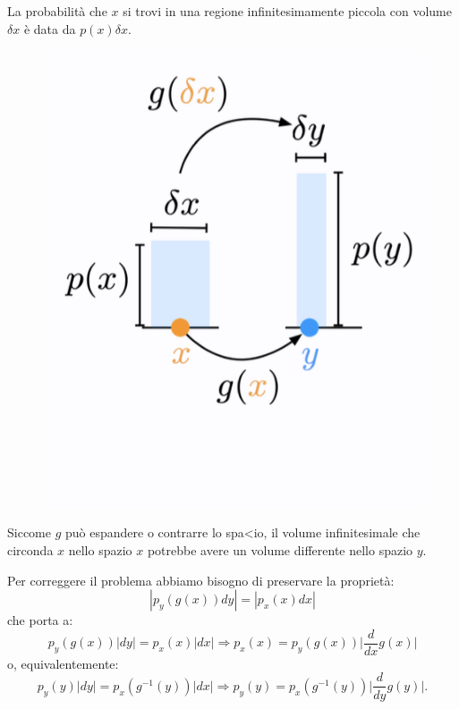 La probabilità che $x$ si trovi in una regione infinitesimamente piccola con volume $\delta x$ è data da $p(x)\delta x$.
\begin{figure}[!h]
    \includegraphics[scale=.7]{images/prerequisites/ex02.png}
    \centering
\end{figure}



Siccome $g$ può espandere o contrarre lo spa<io, il volume infinitesimale che circonda $x$ nello spazio $x$ potrebbe avere un volume differente nello spazio $y$.



Per correggere il problema abbiamo bisogno di preservare la proprietà:
\begin{equation}
    |p_y(g(x))dy|=|p_x(x)dx|
\end{equation}
che porta a:
\begin{equation}
    p_y(g(x))|dy|=p_x(x)|dx| \Rightarrow p_x(x)=p_y(g(x))\Big| \frac{d}{dx}g(x) \Big|
\end{equation}
o, equivalentemente:
\begin{equation}
    p_y(y)|dy|=p_x(g^{-1}(y))|dx| \Rightarrow p_y(y)=p_x(g^{-1}(y))\Big| \frac{d}{dy}g(y) \Big|.
\end{equation}



